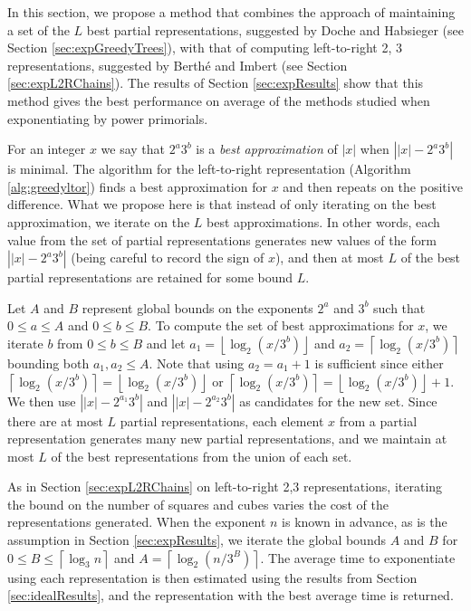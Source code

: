 \documentclass{ucalgthes1}
\theoremstyle{definition}
\newcommand{\floor}[1]{\left\lfloor #1 \right\rfloor}
\newcommand{\ceil}[1]{\left\lceil #1 \right\rceil}
\begin{document}
In this section, we propose a method that combines the approach of maintaining a set of the $L$ best partial representations, suggested by Doche and Habsieger \cite{Doche2008} (see Section \ref{sec:expGreedyTrees}), with that of computing left-to-right 2, 3 representations, suggested by Berth{\'e} and Imbert \cite{Berthe2009} (see Section \ref{sec:expL2RChains}).  The results of Section \ref{sec:expResults} show that this method gives the best performance on average of the methods studied when exponentiating by power primorials.

For an integer $x$ we say that $2^a3^b$ is a \emph{best approximation} of $|x|$ when $\left||x| - 2^a3^b \right|$ is minimal.  The algorithm for the left-to-right representation (Algorithm \ref{alg:greedyltor}) finds a best approximation for $x$ and then repeats on the positive difference.  What we propose here is that instead of only iterating on the best approximation, we iterate on the $L$ best approximations.  In other words, each value from the set of partial representations generates new values of the form $\left||x| - 2^a3^b\right|$ (being careful to record the sign of $x$), and then at most $L$ of the best partial representations are retained for some bound $L$.

Let $A$ and $B$ represent global bounds on the exponents $2^a$ and $3^b$ such that $0 \le a \le A$ and $0 \le b \le B$.  To compute the set of best approximations for $x$, we iterate $b$ from $0 \le b \le B$ and let $a_1 = \floor{\log_2 (x/3^b)}$ and $a_2 = \ceil{\log_2 (x/3^b)}$ bounding both $a_1, a_2 \le A$.  Note that using $a_2 = a_1 + 1$ is sufficient since either $\ceil{\log_2 (x/3^b)} = \floor{\log_2 (x/3^b)}$ or $\ceil{\log_2 (x/3^b)} = \floor{\log_2 (x/3^b)} + 1$.  We then use $\left||x|-2^{a_1}3^b\right|$ and $\left||x|-2^{a_2}3^b\right|$ as candidates for the new set.  Since there are at most $L$ partial representations, each element $x$ from a partial representation generates many new partial representations, and we maintain at most $L$ of the best representations from the union of each set.

As in Section \ref{sec:expL2RChains} on left-to-right 2,3 representations, iterating the bound on the number of squares and cubes varies the cost of the representations generated.  When the exponent $n$ is known in advance, as is the assumption in Section \ref{sec:expResults}, we iterate the global bounds $A$ and $B$ for $0 \le B \le \ceil{\log_3 n}$ and $A = \ceil{\log_2 (n/3^B)}$.  The average time to exponentiate using each representation is then estimated using the results from Section \ref{sec:idealResults}, and the representation with the best average time is returned.  
\end{document}
